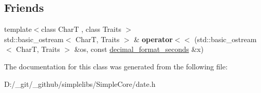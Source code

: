\subsection*{Friends}
\begin{DoxyCompactItemize}
\item 
\mbox{\label{classdate_1_1detail_1_1decimal__format__seconds_afec5c6bb3e79700c56a3b8d9a6c525a5}} 
{\footnotesize template$<$class CharT , class Traits $>$ }\\std\+::basic\+\_\+ostream$<$ CharT, Traits $>$ \& {\bfseries operator$<$$<$} (std\+::basic\+\_\+ostream$<$ CharT, Traits $>$ \&os, const \mbox{\hyperlink{classdate_1_1detail_1_1decimal__format__seconds}{decimal\+\_\+format\+\_\+seconds}} \&x)
\end{DoxyCompactItemize}


The documentation for this class was generated from the following file\+:\begin{DoxyCompactItemize}
\item 
D\+:/\+\_\+git/\+\_\+github/simplelibs/\+Simple\+Core/date.\+h\end{DoxyCompactItemize}
